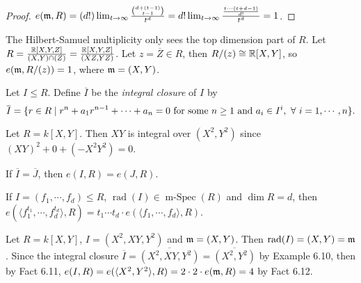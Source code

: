 \begin{proof}
    $e(\mathfrak{m},R) = (d!) \lim_{t \to \infty} \frac{\binom{d+(t-1)}{t-1}}{t^{d}} = d! \lim_{t \to \infty} \frac{\frac{t \cdots (t+d-1)}{d!}}{t^{d}} = 1$.
\end{proof}

\begin{fact}
    The Hilbert-Samuel multiplicity only sees the top dimension part of $R$. Let $R = \frac{\mathbb{R}[X,Y,Z]}{(X,Y) \cap (Z)} = \frac{\mathbb{R}[X,Y,Z]}{(XZ,YZ)}$. Let $z = \overbar{Z} \in R$, then $R/(z) \cong \mathbb{R}[X,Y]$, so $e(\mathfrak{m},R/(z)) = 1$, where $\mathfrak{m} = (X,Y)$.
\end{fact}

\begin{definition}
    Let $I \leq R$. Define $\overbar{I}$ be the \emph{integral closure} of $I$ by 
    \[\overbar{I} = \{r \in R \mid r^{n} + a_1r^{n-1} + \cdots + a_n = 0 \text{ for some $n \geq 1$ and $a_i \in I^{i}$}, \fa i = 1,\cdots,n\}.\]
\end{definition}

\begin{example}
    Let $R = k[X,Y]$. Then $XY$ is integral over $(X^{2},Y^{2})$ since $(XY)^{2} + 0 + (-X^{2}Y^{2}) = 0$.
\end{example}

\begin{fact}
    If $\overbar{I} = \overbar{J}$, then $e(I,R) = e(J,R)$.
\end{fact}

\begin{fact}
    If $I = (f_1,\cdots,f_d) \leq R$, $\operatorname{rad}(I) \in \operatorname{m-Spec}(R)$ and $\dim R = d$, then $e(\langle f_1^{t_1},\cdots,f_d^{t_d} \rangle,R) = t_1 \cdots t_d \cdot e(\langle f_1,\cdots,f_d \rangle,R)$.
\end{fact}

\begin{example}
    Let $R = k[X,Y]$, $I = (X^{2},XY,Y^{2})$ and $\mathfrak{m} = (X,Y)$. Then $\operatorname{rad}(I) = (X,Y) = \mathfrak{m}$. Since the integral closure $\overbar{I} = \overbar{(X^{2},XY,Y^{2})} = \overbar{(X^{2},Y^{2})}$ by Example 6.10, then by Fact 6.11, $e(I,R) = e(\langle X^{2},Y^{2} \rangle, R) = 2 \cdot 2 \cdot e(\mathfrak{m},R) = 4$ by Fact 6.12.
\end{example}


